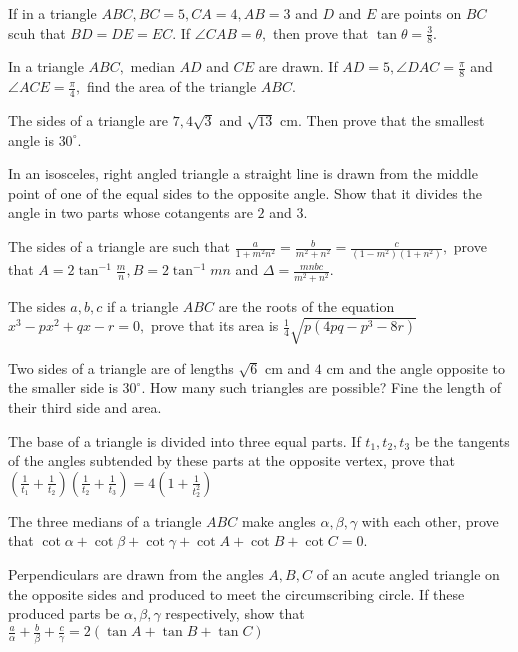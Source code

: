 \item If in a triangle $ABC, BC = 5, CA = 4, AB = 3$ and $D$ and $E$ are points on $BC$ scuh that $BD =
    DE = EC.$ If $\angle CAB=\theta,$ then prove that $\tan\theta = \frac{3}{8}.$

\item In a triangle $ABC,$ median $AD$ and $CE$ are drawn. If $AD = 5, \angle DAC = \frac{\pi}{8}$ and
    $\angle ACE = \frac{\pi}{4},$ find the area of the triangle $ABC.$

\item The sides of a triangle are $7, 4\sqrt{3}$ and $\sqrt{13}$ cm. Then prove that the smallest angle is
    $30^\circ.$

\item In an isosceles, right angled triangle a straight line is drawn from the middle point of one of the equal sides to the opposite
    angle. Show that it divides the angle in two parts whose cotangents are $2$ and $3.$

\item The sides of a triangle are such that $\frac{a}{1 + m^2n^2} = \frac{b}{m^2 + n^2} = \frac{c}{(1- m^2)(1 + n^2)},$ prove
    that $A = 2\tan^{-1}\frac{m}{n}, B = 2\tan^{-1}mn$ and $\Delta = \frac{mnbc}{m^2 + n^2}.$

\item The sides $a, b, c$ if a triangle $ABC$ are the roots of the equation $x^3 - px^2 + qx - r = 0,$ prove that
    its area is $\frac{1}{4}\sqrt{p(4pq - p^3 - 8r)}$

\item Two sides of a triangle are of lengths $\sqrt{6}$ cm and $4$ cm and the angle opposite to the smaller side is
     $30^\circ.$ How many such triangles are possible? Fine the length of their third side and area.

\item The base of a triangle is divided into three equal parts. If $t_1, t_2, t_3$ be the tangents of the angles subtended by
     these parts at the opposite vertex, prove that $\left(\frac{1}{t_1} + \frac{1}{t_2}\right)\left(\frac{1}{t_2} +
     \frac{1}{t_3}\right) = 4\left(1 + \frac{1}{t_2^2}\right)$

\item The three medians of a triangle $ABC$ make angles $\alpha, \beta, \gamma$ with each other, prove that
     $\cot\alpha + \cot\beta + \cot\gamma + \cot A + \cot B + \cot C = 0.$

\item Perpendiculars are drawn from the angles $A, B, C$ of an acute angled triangle on the opposite sides and produced to
     meet the circumscribing circle. If these produced parts be $\alpha, \beta, \gamma$ respectively, show that
     $\frac{a}{\alpha} + \frac{b}{\beta} + \frac{c}{\gamma} = 2(\tan A + \tan B + \tan C)$

